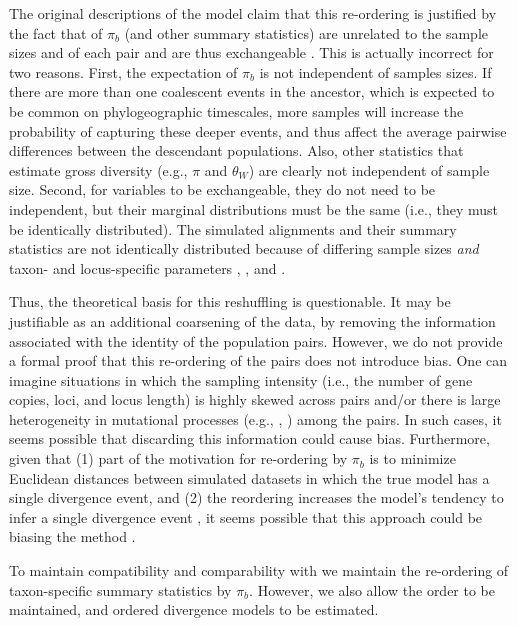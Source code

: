 The original descriptions of the \msb model claim that this re-ordering is
justified by the fact that of $\pi_b$ (and other summary statistics) are
unrelated to the sample sizes  and  of
each pair and are thus exchangeable \citep{Hickerson2006,Huang2011}.
This is actually incorrect for two reasons.
First, the expectation of $\pi_b$ is not independent of samples sizes.
If there are more than one coalescent events in the ancestor, which is expected
to be common on phylogeographic timescales, more samples will increase the
probability of capturing these deeper events, and thus affect the average
pairwise differences between the descendant populations.
Also, other statistics that estimate gross diversity (e.g., $\pi$ and
$\theta_W$) are clearly not independent of sample size.
Second, for variables to be exchangeable, they do not need to be independent,
but their marginal distributions must be the same (i.e., they must be
identically distributed).
The simulated alignments and their summary statistics are not identically
distributed because of differing sample sizes \emph{and} taxon- and
locus-specific parameters \hkyModel{}{}, \mutationRateScalarConstant{}{}, and
\ploidyScalar{}{}.

Thus, the theoretical basis for this reshuffling is questionable.
It may be justifiable as an additional coarsening of the data,
by removing the information associated with the identity of the
population pairs.
However, we do not provide a formal proof that this re-ordering of the pairs
does not introduce bias.
One can imagine situations in which the sampling intensity (i.e., the
number of gene copies, loci, and locus length) is highly skewed across
pairs and/or there is large heterogeneity in mutational processes
(e.g., \hkyModel{}{}, \mutationRateScalarConstant{}{}) among the pairs.
In such cases, it seems possible that discarding this information could
cause bias.
Furthermore, given that (1) part of the motivation for re-ordering by $\pi_b$
is to minimize Euclidean distances between simulated datasets in which the true
model has a single divergence event, and (2) the reordering increases the
model's tendency to infer a single divergence event \citep{Huang2011}, it seems
possible that this approach could be biasing the method \citep{Oaks2012}.

To maintain compatibility and comparability with \msb we maintain
the re-ordering of taxon-specific summary statistics by $\pi_b$.
However, we also allow the order to be maintained, and ordered
divergence models to be estimated.

